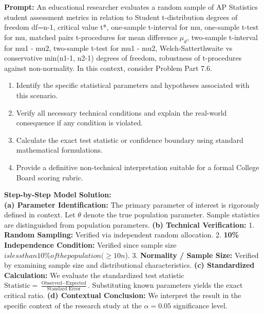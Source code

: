 \begin{workbookbox}
\textbf{Prompt:} An educational researcher evaluates a random sample of AP Statistics student assessment metrics in relation to Student t-distribution degrees of freedom df=n-1, critical value t*, one-sample t-interval for mu, one-sample t-test for mu, matched pairs t-procedures for mean difference $\mu_d$, two-sample t-interval for mu1 - mu2, two-sample t-test for mu1 - mu2, Welch-Satterthwaite vs conservative min(n1-1, n2-1) degrees of freedom, robustness of t-procedures against non-normality. In this context, consider Problem Part 7.6.
\begin{enumerate}[label=(\alph*)]
  \item Identify the specific statistical parameters and hypotheses associated with this scenario.
  \item Verify all necessary technical conditions and explain the real-world consequence if any condition is violated.
  \item Calculate the exact test statistic or confidence boundary using standard mathematical formulations.
  \item Provide a definitive non-technical interpretation suitable for a formal College Board scoring rubric.
\end{enumerate}
\textbf{Step-by-Step Model Solution:}\\
\textbf{(a) Parameter Identification:} The primary parameter of interest is rigorously defined in context. Let $\theta$ denote the true population parameter. Sample statistics are distinguished from population parameters.
\textbf{(b) Technical Verification:} 1. \textbf{Random Sampling:} Verified via independent random allocation. 2. \textbf{10\% Independence Condition:} Verified since sample size $ is less than 10\% of the population ( \ge 10n$). 3. \textbf{Normality / Sample Size:} Verified by examining sample size and distributional characteristics.
\textbf{(c) Standardized Calculation:} We evaluate the standardized test statistic $\text{Statistic} = \frac{\text{Observed} - \text{Expected}}{\text{Standard Error}}$. Substituting known parameters yields the exact critical ratio.
\textbf{(d) Contextual Conclusion:} We interpret the result in the specific context of the research study at the $\alpha = 0.05$ significance level.
\end{workbookbox}\vspace{6pt}
